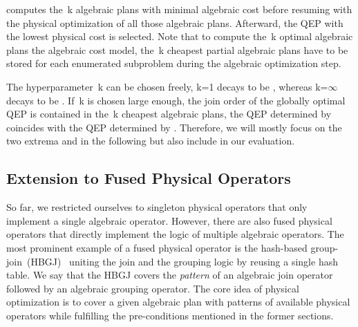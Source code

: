 \topk computes the~k algebraic plans with minimal algebraic cost before resuming with the physical optimization of all those algebraic plans.  Afterward, the QEP with the lowest physical cost is selected.  Note that to compute the~k optimal algebraic plans \wrt the algebraic cost model, the~k cheapest partial algebraic plans have to be stored for each enumerated subproblem during the algebraic optimization step.

The hyperparameter~k can be chosen freely, \eg k=1 decays to be \split, whereas k=$\infty$ decays to be \holistic.  If~k is chosen large enough, \ie the join order of the globally optimal QEP is contained in the~k cheapest algebraic plans, the QEP determined by \topk coincides with the QEP determined by \holistic.  Therefore, we will mostly focus on the two extrema \split and \holistic in the following but also include \topk in our evaluation.  

\subsection{Extension to Fused Physical Operators}
\label{sec:impl-fused_phys_ops}

So far, we restricted ourselves to singleton physical operators that only implement a single algebraic operator.  However, there are also fused physical operators that directly implement the logic of multiple algebraic operators.  The most prominent example of a fused physical operator is the hash-based group-join~(HBGJ)~\cite{groupjoin_invented, groupjoin, book_moerkotte} uniting the join and the grouping logic by reusing a single hash table.  We say that the HBGJ covers the \emph{pattern} of an algebraic join operator followed by an algebraic grouping operator.  The core idea of physical optimization is to cover a given algebraic plan with patterns of available physical operators while fulfilling the pre-conditions mentioned in the former sections.  %

